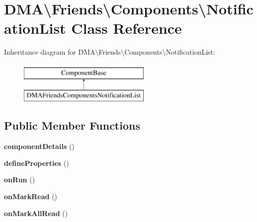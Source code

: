 \hypertarget{classDMA_1_1Friends_1_1Components_1_1NotificationList}{}\section{D\+M\+A\textbackslash{}Friends\textbackslash{}Components\textbackslash{}Notification\+List Class Reference}
\label{classDMA_1_1Friends_1_1Components_1_1NotificationList}
Inheritance diagram for D\+M\+A\textbackslash{}Friends\textbackslash{}Components\textbackslash{}Notification\+List\+:\begin{figure}[H]
\begin{center}
\leavevmode
\includegraphics[height=2.000000cm]{dc/d03/classDMA_1_1Friends_1_1Components_1_1NotificationList}
\end{center}
\end{figure}
\subsection*{Public Member Functions}
\begin{DoxyCompactItemize}
\item 
\hypertarget{classDMA_1_1Friends_1_1Components_1_1NotificationList_a5f6b1107482bf7d15e379cad1c58e537}{}{\bfseries component\+Details} ()\label{classDMA_1_1Friends_1_1Components_1_1NotificationList_a5f6b1107482bf7d15e379cad1c58e537}

\item 
\hypertarget{classDMA_1_1Friends_1_1Components_1_1NotificationList_a0e98d6eba8a7d10629c7a0e051937d98}{}{\bfseries define\+Properties} ()\label{classDMA_1_1Friends_1_1Components_1_1NotificationList_a0e98d6eba8a7d10629c7a0e051937d98}

\item 
\hypertarget{classDMA_1_1Friends_1_1Components_1_1NotificationList_a5756b2cf174bc7919896c256ad9f44aa}{}{\bfseries on\+Run} ()\label{classDMA_1_1Friends_1_1Components_1_1NotificationList_a5756b2cf174bc7919896c256ad9f44aa}

\item 
\hypertarget{classDMA_1_1Friends_1_1Components_1_1NotificationList_aea88b4438deaa71ced9f3cdc53cb0d94}{}{\bfseries on\+Mark\+Read} ()\label{classDMA_1_1Friends_1_1Components_1_1NotificationList_aea88b4438deaa71ced9f3cdc53cb0d94}

\item 
\hypertarget{classDMA_1_1Friends_1_1Components_1_1NotificationList_a8dfae281c32e5b31c7dbab3fe91d74f1}{}{\bfseries on\+Mark\+All\+Read} ()\label{classDMA_1_1Friends_1_1Components_1_1NotificationList_a8dfae281c32e5b31c7dbab3fe91d74f1}

\end{DoxyCompactItemize}
